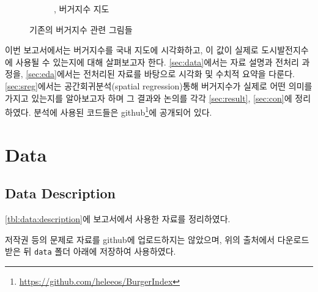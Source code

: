 \documentclass{scrartcl}
\begin{document}
\begin{figure}[!ht]
\begin{subfigure}[b]{0.3\textwidth}
        \caption{\citet{jang2014}, 버거지수 지도}\label{fig:jangmap}
    \end{subfigure}
    \caption{기존의 버거지수 관련 그림들}
\end{figure}

이번 보고서에서는 버거지수를 국내 지도에 시각화하고, 이 값이 실제로 도시발전지수에 사용될 수 있는지에 대해 살펴보고자 한다. \autoref{sec:data}에서는 자료 설명과 전처리 과정을, \autoref{sec:eda}에서는 전처리된 자료를 바탕으로 시각화 및 수치적 요약을 다룬다. \autoref{sec:sreg}에서는 공간회귀분석(spatial regression)\을 통해 버거지수가 실제로 어떤 의미를 가지고 있는지를 알아보고자 하며 그 결과와 논의를 각각 \autoref{sec:result}, \autoref{sec:con}에 정리하였다. 분석에 사용된 코드들은 github\footnote{\url{https://github.com/heleeos/BurgerIndex}}에 공개되어 있다.

\section{Data}\label{sec:data}

\subsection{Data Description}\label{subsec:data:desc}

\autoref{tbl:data:description}에 보고서에서 사용한 자료를 정리하였다. 

\begin{table}[ht]
    \centering
	\caption{Data Description}\label{tbl:data:description}
\end{table}

저작권 등의 문제로 자료를 github에 업로드하지는 않았으며, 위의 출처에서 다운로드 받은 뒤 \texttt{data} 폴더 아래에 저장하여 사용하였다.
\end{document}
